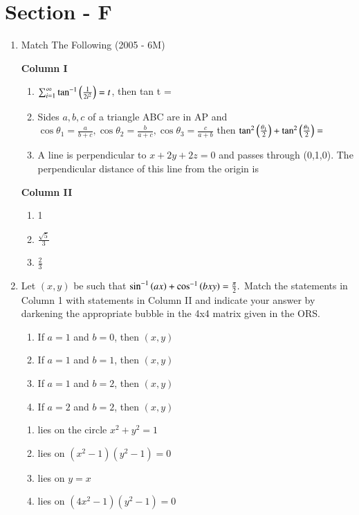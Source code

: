 \documentclass[journal,12pt,twocolumn]{IEEEtran}
\theoremstyle{remark}
\begin{document}
\section*{Section - F}
\begin{enumerate}
	\item{
		Match The Following \hfill (2005 - 6M)
		\begin{multicols}{2}
			\textbf{Column I}\\
			\begin{enumerate}
				\item{$\sum_{i=1}^{\infty}\tan^{-1}\left(\frac{1}{2i^2}\right)=t$, then tan t =}\\
				\item{Sides $a,b,c$ of a triangle ABC are in AP and $\cos\theta_1=\frac{a}{b+c}, \cos\theta_2=\frac{b}{a+c}, \cos\theta_3=\frac{c}{a+b}$ then $\tan^2\left(\frac{\theta_1}{2}\right)+\tan^2\left(\frac{\theta_3}{2}\right) = $}\\
				\item{A line is perpendicular to $x+2y+2z=0$ and passes through (0,1,0). The perpendicular distance of this line from the origin is}
			\end{enumerate}
			\columnbreak
			\textbf{Column II}\\
			\begin{enumerate}
				\item{1}\\
				\item{$\frac{\sqrt{5}}{3}$}\\
				\item{$\frac{2}{3}$}
			\end{enumerate}
		\end{multicols}}
	\item{
		Let $(x,y)$ be such that $\sin^{-1}\left(ax\right)+\cos^{-1}\left(bxy\right)=\frac{\pi}{2}.\\$
		Match the statements in Column 1 with statements in Column II and indicate your answer by darkening the appropriate bubble in the 4x4 matrix given in the ORS.
		\begin{multicols}{2}
			\begin{enumerate}
				\item{If $a=1$ and $b=0$, then $(x, y)$}
				\item{If $a=1$ and $b=1$, then $(x, y)$}
				\item{If $a=1$ and $b=2$, then $(x, y)$}
				\item{If $a=2$ and $b=2$, then $(x, y)$}
			\end{enumerate}
			\columnbreak
			\begin{enumerate}
				\item{lies on the circle $x^2 + y^2 = 1$}
				\item{lies on $(x^2-1)(y^2-1)=0$}
				\item{lies on $y=x$}
				\item{lies on $(4x^2-1)(y^2-1)=0$}
			\end{enumerate}
		\end{multicols}}
	

\end{enumerate}
\end{document}
